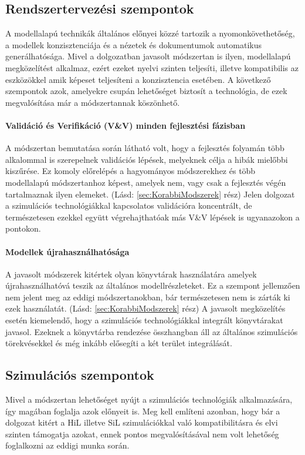         \subsection{Rendszertervezési szempontok}
        A modellalapú technikák általános előnyei közzé tartozik a nyomonkövethetőség, a modellek konzisztenciája és a nézetek és dokumentumok automatikus generálhatósága.
        Mivel a dolgozatban javasolt módszertan is ilyen, modellalapú megközelítést alkalmaz, ezért ezeket nyelvi szinten teljesíti, illetve kompatibilis az eszközökkel amik képeset teljesíteni a konzisztencia esetében.
        A következő szempontok azok, amelyekre csupán lehetőséget biztosít a technológia, de ezek megvalósítása már a módszertannak köszönhető.

            \paragraph{Validáció és Verifikáció (V\&V) minden fejlesztési fázisban} \label{ertekelesVV}
            A módszertan bemutatása során látható volt, hogy a fejlesztés folyamán több alkalommal is szerepelnek validációs lépések, melyeknek célja a hibák mielőbbi kiszűrése.
            Ez komoly előrelépés a hagyományos módszerekhez és több modellalapú módszertanhoz képest, amelyek nem, vagy csak a fejlesztés végén tartalmaznak ilyen elemeket. (Lásd: \ref{sec:KorabbiModszerek} rész)
            Jelen dolgozat a szimulációs technológiákkal kapcsolatos validációra koncentrált, de természetesen ezekkel együtt végrehajthatóak más V\&V lépések is ugyanazokon a pontokon.

            \paragraph{Modellek újrahasználhatósága}
            A javasolt módszerek kitértek olyan könyvtárak használatára amelyek újrahasználhatóvá teszik az általános modellrészleteket.
            Ez a szempont jellemzően nem jelent meg az eddigi módszertanokban, bár természetesen nem is zárták ki ezek használatát. (Lásd: \ref{sec:KorabbiModszerek} rész)
            A javasolt megközelítés esetén kiemelendő, hogy a szimulációs technológiákkal integrált könyvtárakat javasol. Ezeknek a könyvtárba rendezése összhangban áll az általános szimulációs törekvésekkel és még inkább elősegíti a két terület integrálását.

        \subsection{Szimulációs szempontok}
        Mivel a módszertan lehetőséget nyújt a szimulációs technológiák alkalmazására, így magában foglalja azok előnyeit is.
        Meg kell említeni azonban, hogy bár a dolgozat kitért a HiL illetve SiL szimulációkkal való kompatibilitásra és elvi szinten támogatja azokat, ennek pontos megvalósításával nem volt lehetőség foglalkozni az eddigi munka során.

